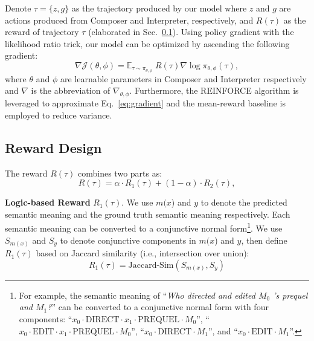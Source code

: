 \documentclass[11pt,a4paper]{article}
\begin{document}
Denote $\tau = \{z, g\}$ as the trajectory produced by our model where $z$ and $g$ are actions produced from  Composer and Interpreter, respectively, and $R(\tau)$ as the reward of trajectory $\tau$ (elaborated in Sec.~\ref{sec:reward}).
Using policy gradient \cite{policy_gradient_1999} with the likelihood ratio trick, our model can be optimized by ascending the following gradient:
\begin{equation}\label{eq:gradient}
    \nabla \mathcal{J}(\theta, \phi)=\mathbb{E}_{\tau \sim {\pi}_{\theta, \phi}}\;R(\tau)\nabla \log \pi_{ \theta, \phi}\left(\tau\right),
\end{equation}
where $\theta$ and $\phi$ are learnable parameters in Composer and Interpreter respectively and $\nabla$ is the abbreviation of $\nabla_{ \theta, \phi}$. 
Furthermore, the REINFORCE algorithm \cite{reinforce_algo_1992} is leveraged to approximate Eq.~\ref{eq:gradient} and the mean-reward baseline \cite{reinforce_baseline_2001} is employed to reduce variance.















\subsection{Reward Design}\label{sec:reward}
The reward $R\left({\tau}\right)$ combines two parts as:
\begin{equation}
    R\left({\tau}\right) = 
    \alpha \cdot R_1\left({\tau}\right) + (1-\alpha) \cdot R_2\left({\tau}\right),
\end{equation}


\noindent \textbf{Logic-based Reward} $R_1(\tau)$.
We use $m(x$) and $y$ to denote the predicted semantic meaning and the ground truth semantic meaning respectively.
Each semantic meaning can be converted to a conjunctive normal form\footnote{
For example, the semantic meaning of ``\emph{Who directed and edited $M_0$ 's prequel and $M_1$?}'' can be converted to a conjunctive normal form with four components:
``$x_0\cdot\text{DIRECT}\cdot x_1\cdot\text{PREQUEL}\cdot M_0$'',
``$x_0\cdot\text{EDIT}\cdot x_1\cdot\text{PREQUEL}\cdot M_0$'',
``$x_0\cdot\text{DIRECT}\cdot M_1$'', and
``$x_0\cdot\text{EDIT}\cdot M_1$''.}.
We use $S_{m(x)}$ and $S_y$ to denote conjunctive components in $m(x$) and $y$, then define $R_1(\tau)$ based on Jaccard similarity (i.e., intersection over union):
\begin{equation}\label{eq:reward sentence CFQ}
    R_1\left({\tau}\right) = 
    \text{Jaccard-Sim}(S_{m(x)}, S_y)
\end{equation}
\end{document}
